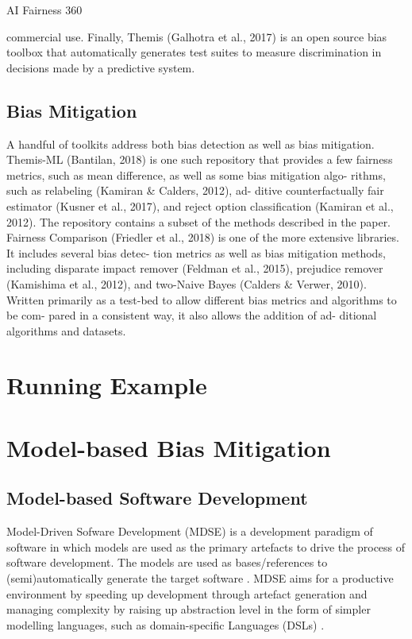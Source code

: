 \documentclass[sigconf,review]{acmart}
\begin{document}
AI Fairness 360

commercial use. Finally, Themis (Galhotra et al., 2017) is
an open source bias toolbox that automatically generates
test suites to measure discrimination in decisions made by
a predictive system.



\subsection{Bias Mitigation}
\label{sec:bias_mitigation}

A handful of toolkits address both bias detection as well
as bias mitigation. Themis-ML (Bantilan, 2018) is one
such repository that provides a few fairness metrics, such
as mean difference, as well as some bias mitigation algo-
rithms, such as relabeling (Kamiran \& Calders, 2012), ad-
ditive counterfactually fair estimator (Kusner et al., 2017),
and reject option classiﬁcation (Kamiran et al., 2012). The
repository contains a subset of the methods described in the
paper. Fairness Comparison (Friedler et al., 2018) is one of
the more extensive libraries. It includes several bias detec-
tion metrics as well as bias mitigation methods, including
disparate impact remover (Feldman et al., 2015), prejudice
remover (Kamishima et al., 2012), and two-Naive Bayes
(Calders \& Verwer, 2010). Written primarily as a test-bed
to allow different bias metrics and algorithms to be com-
pared in a consistent way, it also allows the addition of ad-
ditional algorithms and datasets.

\section{Running Example}
\label{sec:running_example}


\section{Model-based Bias Mitigation}
\label{sec:model_based_bias_mitigation}


\subsection{Model-based Software Development}
\label{sec:model_based_software_development}
Model-Driven Sofware Development (MDSE) is a development paradigm of software in which models are used as the primary artefacts to drive the process of software development. The models are used as bases/references to (semi)automatically generate the target software \cite{brambilla2017model}. MDSE aims for a productive environment by speeding up development through artefact generation and managing complexity by raising up abstraction level in the form of simpler modelling languages, such as domain-specific Languages (DSLs) \cite{volter2013model}. 
\end{document}
